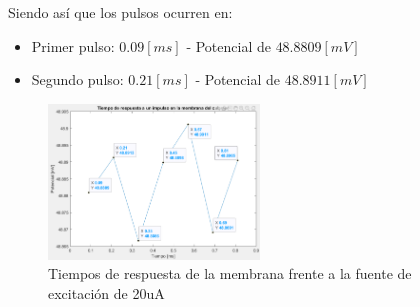 \documentclass[conference]{IEEEtran}
\begin{document}
	Siendo así que los pulsos ocurren en:
	
	\begin{itemize}
		\item Primer pulso: $0.09 [ms]$ - Potencial de $48.8809 [mV]$
		\item Segundo pulso: $0.21 [ms]$ - Potencial de $48.8911 [mV]$
	\end{itemize}
	
	\newpage

	\begin{figure}[h]
		\centering
		\includegraphics[width=0.5\textwidth]{media/tiempo-respuesta-pulso}
		\caption{Tiempos de respuesta de la membrana frente a la fuente de excitación de 20uA}
		\label{fig:tiempo-respuesta-pulso}
	\end{figure}
	
	
	
	
	
\end{document}
